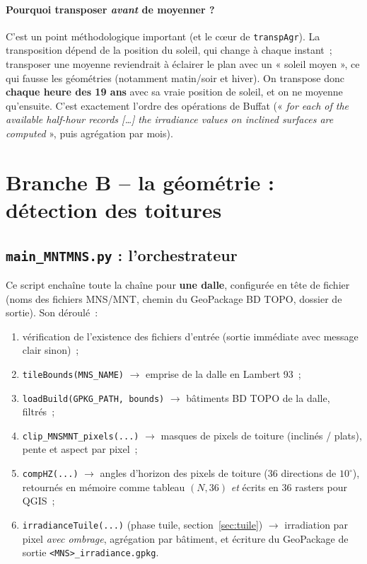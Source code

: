 \documentclass[11pt,a4paper]{article}
\newcommand{\fichier}[1]{\texttt{#1}}
\newcommand{\fonction}[1]{\texttt{#1}}
\begin{document}
\paragraph{Pourquoi transposer \emph{avant} de moyenner ?} C'est un point
méthodologique important (et le cœur de \fonction{transpAgr}). La transposition
dépend de la position du soleil, qui change à chaque instant~; transposer une
moyenne reviendrait à éclairer le plan avec un « soleil moyen », ce qui fausse
les géométries (notamment matin/soir et hiver). On transpose donc \textbf{chaque
heure des 19 ans} avec sa vraie position de soleil, et on ne moyenne
qu'ensuite. C'est exactement l'ordre des opérations de Buffat
(« \emph{for each of the available half-hour records [\ldots] the irradiance
values on inclined surfaces are computed} », puis agrégation par mois).

\section{Branche B -- la géométrie : détection des toitures}

\subsection{\fichier{main\_MNTMNS.py} : l'orchestrateur}

Ce script enchaîne toute la chaîne pour \textbf{une dalle}, configurée en tête de
fichier (noms des fichiers MNS/MNT, chemin du GeoPackage BD TOPO, dossier de
sortie). Son déroulé~:

\begin{enumerate}
  \item vérification de l'existence des fichiers d'entrée (sortie immédiate avec
    message clair sinon)~;
  \item \fonction{tileBounds(MNS\_NAME)} $\rightarrow$ emprise de la dalle en
    Lambert 93~;
  \item \fonction{loadBuild(GPKG\_PATH, bounds)} $\rightarrow$ bâtiments BD TOPO
    de la dalle, filtrés~;
  \item \fonction{clip\_MNSMNT\_pixels(...)} $\rightarrow$ masques de pixels de
    toiture (inclinés / plats), pente et aspect par pixel~;
  \item \fonction{compHZ(...)} $\rightarrow$ angles d'horizon des pixels de
    toiture (36 directions de $10^\circ$), retournés en mémoire comme tableau
    $(N, 36)$ \emph{et} écrits en 36 rasters pour QGIS~;
  \item \fonction{irradianceTuile(...)} (phase tuile, section~\ref{sec:tuile})
    $\rightarrow$ irradiation par pixel \emph{avec ombrage}, agrégation par
    bâtiment, et écriture du GeoPackage de sortie
    \fichier{<MNS>\_irradiance.gpkg}.
\end{enumerate}
\end{document}

